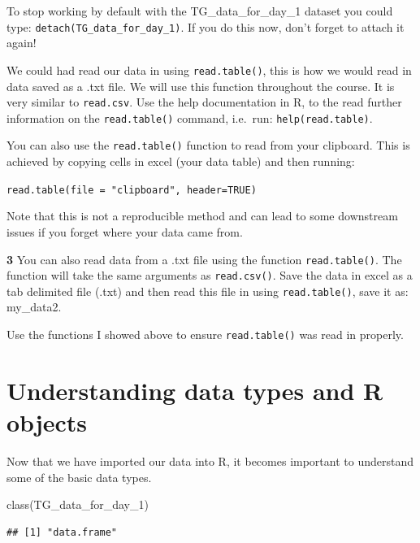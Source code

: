 \documentclass[
]{book}
\makeatletter
\newenvironment{Shaded}{\begin{snugshade}}{\end{snugshade}}
\newcommand{\FunctionTok}[1]{\textcolor[rgb]{0.00,0.00,0.00}{#1}}
\newcommand{\NormalTok}[1]{#1}
\newenvironment{kframe}{%
\medskip{}
\setlength{\fboxsep}{.8em}
 \def\at@end@of@kframe{}%
 \ifinner\ifhmode%
  \def\at@end@of@kframe{\end{minipage}}%
  \begin{minipage}{\columnwidth}%
 \fi\fi%
 \def\FrameCommand##1{\hskip\@totalleftmargin \hskip-\fboxsep
 \colorbox{shadecolor}{##1}\hskip-\fboxsep
     \hskip-\linewidth \hskip-\@totalleftmargin \hskip\columnwidth}%
 \MakeFramed {\advance\hsize-\width
   \@totalleftmargin\z@ \linewidth\hsize
   \@setminipage}}%
 {\par\unskip\endMakeFramed%
 \at@end@of@kframe}
\newenvironment{rmdblock}[1]
  {
  \begin{itemize}
  \renewcommand{\labelitemi}{
    \raisebox{-.7\height}[0pt][0pt]{
      {\setkeys{Gin}{width=3em,keepaspectratio}\texttt{[image: images/\#1]}}
    }
  }
  \setlength{\fboxsep}{1em}
  \begin{kframe}
  \item
  }
  {
  \end{kframe}
  \end{itemize}
  }
\newenvironment{rmdquiz}
  {\begin{rmdblock}{quiz}}
  {\end{rmdblock}}
\makeatother
\begin{document}
To stop working by default with the TG\_data\_for\_day\_1 dataset you could type: \texttt{detach(TG\_data\_for\_day\_1)}. If you do this now, don't forget to attach it again!

We could had read our data in using \texttt{read.table()}, this is how we would read in data saved as a .txt file. We will use this function throughout the course. It is very similar to \texttt{read.csv}. Use the help documentation in R, to the read further information on the \texttt{read.table()} command, i.e.~run: \texttt{help(read.table)}.

You can also use the \texttt{read.table()} function to read from your clipboard. This is achieved by copying cells in excel (your data table) and then running:

\texttt{read.table(file\ =\ "clipboard",\ header=TRUE)}

Note that this is not a reproducible method and can lead to some downstream issues if you forget where your data came from.

\begin{rmdquiz}
\textbf{3} You can also read data from a .txt file using the function \texttt{read.table()}. The function will take the same arguments as \texttt{read.csv()}. Save the data in excel as a tab delimited file (.txt) and then read this file in using \texttt{read.table()}, save it as: my\_data2.

Use the functions I showed above to ensure \texttt{read.table()} was read in properly.
\end{rmdquiz}

\hypertarget{understanding-data-types-and-r-objects}{%
\section{Understanding data types and R objects}\label{understanding-data-types-and-r-objects}}

Now that we have imported our data into R, it becomes important to understand some of the basic data types.

\begin{Shaded}
\begin{Highlighting}[]
\FunctionTok{class}\NormalTok{(TG\_data\_for\_day\_1)}
\end{Highlighting}
\end{Shaded}

\begin{verbatim}
## [1] "data.frame"
\end{verbatim}
\end{document}
